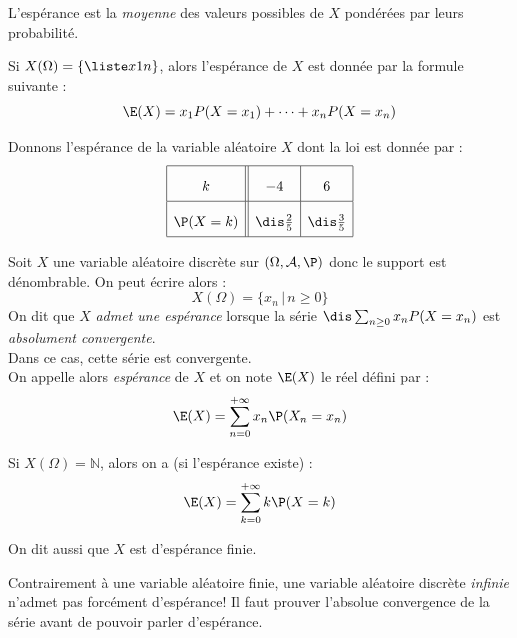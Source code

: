 \documentclass[a4paper,10pt]{report}
\begin{document}
\begin{rems}
\item L'espérance est la \textit{moyenne} des valeurs possibles de $X$ pondérées par leurs probabilité.
\item Si $X(\Omega) = \{\liste x1n \}$, alors l'espérance de $X$ est donnée par la formule suivante :
 $$ \E(X) = x_1 P(X=x_1) + \cdots + x_n P(X=x_n)$$
\end{rems}

\begin{ex} Donnons l'espérance de la variable aléatoire $X$ dont la loi est donnée par :
$$\renewcommand{\arraystretch}{2.1}\begin{array}{|c||c|c|}
\hline
k & -4 & 6\\
\hline
\P(X=k) & \dis\tfrac 2 5 & \dis \tfrac 3 5\\
\hline
\end{array}$$

\vspace{2cm}
\end{ex}


\begin{defin}
Soit $X$ une variable aléatoire discrète sur $(\Omega, \mathcal{A}, \P)$ donc le support est dénombrable. On peut écrire alors :
$$ X(\Omega) = \lbrace x_n \, \vert \, n \geq 0 \rbrace$$
On dit que $X$ \textit{admet une espérance} lorsque la série $\dis \sum_{n \geq 0} x_n P(X=x_n)$ est \textit{absolument convergente}.\\
Dans ce cas, cette série est convergente.\\
On appelle alors \textit{espérance} de $X$ et on note $\E(X)$ le réel défini par :
$$\E(X) = \sum\limits_{n = 0}^{+ \infty} x_n \P(X_n=x_n ) $$
\end{defin}

\noindent Si $X(\Omega)= \mathbb{N}$, alors on a (si l'espérance existe) :
$$\E(X) = \sum\limits_{k=0}^{+\infty} k \P(X=k)$$

\newpage

\begin{rem} On dit aussi que $X$ est d'espérance finie.
\end{rem}

\medskip

\begin{att} Contrairement à une variable aléatoire finie, une variable aléatoire discrète \textit{infinie} n'admet pas forcément d'espérance! Il faut prouver l'absolue convergence de la série avant de pouvoir parler d'espérance. 
\end{att}
\end{document}
